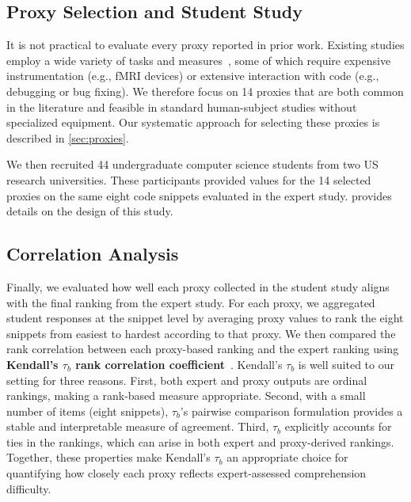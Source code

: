 \subsection{Proxy Selection and Student Study}
\label{sec:our-proxies}



It is not practical to evaluate every proxy reported in prior
work. Existing studies employ a wide variety of tasks and
measures~\cite{Wyrich:ACS23}, some of which require expensive
instrumentation (e.g., fMRI devices) or extensive interaction with
code (e.g., debugging or bug fixing). We therefore focus on 14 proxies
that are both common in the literature and feasible in standard
human-subject studies without specialized equipment. Our systematic
approach for selecting these proxies is described in
\cref{sec:proxies}.

We then recruited 44 undergraduate computer science students from two
US research universities. These participants provided values for the
14 selected proxies on the same eight code snippets evaluated in the
expert study.  provides details on the design
of this study.

\subsection{Correlation Analysis}
\label{sec:correlation}

Finally, we evaluated how well each proxy collected in the student study
aligns with the final ranking from the expert study. For each proxy, we
aggregated student responses at the snippet level by averaging proxy
values to rank the eight snippets from easiest to
hardest according to that proxy.
We then compared the rank correlation between each proxy-based ranking and the expert
ranking using \textbf{Kendall's $\tau_b$ rank
  correlation coefficient}~\cite{kendall1945treatment}. Kendall's
$\tau_b$  is well suited to our setting for three reasons. First, both
expert and proxy outputs are ordinal rankings, making a rank-based
measure appropriate. Second, with a small number of items (eight
snippets), $\tau_b$’s pairwise comparison formulation provides a
stable and interpretable measure of agreement. Third, $\tau_b$
explicitly accounts for ties in the rankings, which can arise in both
expert and proxy-derived rankings. Together, these properties
make Kendall’s $\tau_b$ an appropriate choice for quantifying how
closely each proxy reflects expert-assessed comprehension difficulty.


